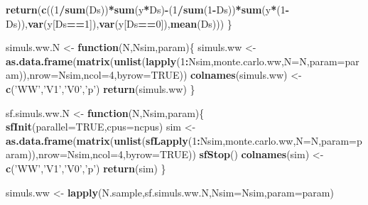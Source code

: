 \documentclass[]{book}
\newenvironment{Shaded}{\begin{snugshade}}{\end{snugshade}}
\newcommand{\KeywordTok}[1]{\textcolor[rgb]{0.13,0.29,0.53}{\textbf{#1}}}
\newcommand{\DataTypeTok}[1]{\textcolor[rgb]{0.13,0.29,0.53}{#1}}
\newcommand{\DecValTok}[1]{\textcolor[rgb]{0.00,0.00,0.81}{#1}}
\newcommand{\StringTok}[1]{\textcolor[rgb]{0.31,0.60,0.02}{#1}}
\newcommand{\OtherTok}[1]{\textcolor[rgb]{0.56,0.35,0.01}{#1}}
\newcommand{\ControlFlowTok}[1]{\textcolor[rgb]{0.13,0.29,0.53}{\textbf{#1}}}
\newcommand{\OperatorTok}[1]{\textcolor[rgb]{0.81,0.36,0.00}{\textbf{#1}}}
\newcommand{\NormalTok}[1]{#1}
\theoremstyle{definition}
\theoremstyle{definition}
\theoremstyle{definition}
\theoremstyle{remark}
\begin{document}
\begin{Shaded}
\begin{Highlighting}[]
  \KeywordTok{return}\NormalTok{(}\KeywordTok{c}\NormalTok{((}\DecValTok{1}\OperatorTok{/}\KeywordTok{sum}\NormalTok{(Ds))}\OperatorTok{*}\KeywordTok{sum}\NormalTok{(y}\OperatorTok{*}\NormalTok{Ds)}\OperatorTok{-}\NormalTok{(}\DecValTok{1}\OperatorTok{/}\KeywordTok{sum}\NormalTok{(}\DecValTok{1}\OperatorTok{-}\NormalTok{Ds))}\OperatorTok{*}\KeywordTok{sum}\NormalTok{(y}\OperatorTok{*}\NormalTok{(}\DecValTok{1}\OperatorTok{-}\NormalTok{Ds)),}\KeywordTok{var}\NormalTok{(y[Ds}\OperatorTok{==}\DecValTok{1}\NormalTok{]),}\KeywordTok{var}\NormalTok{(y[Ds}\OperatorTok{==}\DecValTok{0}\NormalTok{]),}\KeywordTok{mean}\NormalTok{(Ds)))}
\NormalTok{\}}

\NormalTok{simuls.ww.N <-}\StringTok{ }\ControlFlowTok{function}\NormalTok{(N,Nsim,param)\{}
\NormalTok{  simuls.ww <-}\StringTok{ }\KeywordTok{as.data.frame}\NormalTok{(}\KeywordTok{matrix}\NormalTok{(}\KeywordTok{unlist}\NormalTok{(}\KeywordTok{lapply}\NormalTok{(}\DecValTok{1}\OperatorTok{:}\NormalTok{Nsim,monte.carlo.ww,}\DataTypeTok{N=}\NormalTok{N,}\DataTypeTok{param=}\NormalTok{param)),}\DataTypeTok{nrow=}\NormalTok{Nsim,}\DataTypeTok{ncol=}\DecValTok{4}\NormalTok{,}\DataTypeTok{byrow=}\OtherTok{TRUE}\NormalTok{))}
  \KeywordTok{colnames}\NormalTok{(simuls.ww) <-}\StringTok{ }\KeywordTok{c}\NormalTok{(}\StringTok{'WW'}\NormalTok{,}\StringTok{'V1'}\NormalTok{,}\StringTok{'V0'}\NormalTok{,}\StringTok{'p'}\NormalTok{)}
  \KeywordTok{return}\NormalTok{(simuls.ww)}
\NormalTok{\}}

\NormalTok{sf.simuls.ww.N <-}\StringTok{ }\ControlFlowTok{function}\NormalTok{(N,Nsim,param)\{}
  \KeywordTok{sfInit}\NormalTok{(}\DataTypeTok{parallel=}\OtherTok{TRUE}\NormalTok{,}\DataTypeTok{cpus=}\NormalTok{ncpus)}
\NormalTok{  sim <-}\StringTok{ }\KeywordTok{as.data.frame}\NormalTok{(}\KeywordTok{matrix}\NormalTok{(}\KeywordTok{unlist}\NormalTok{(}\KeywordTok{sfLapply}\NormalTok{(}\DecValTok{1}\OperatorTok{:}\NormalTok{Nsim,monte.carlo.ww,}\DataTypeTok{N=}\NormalTok{N,}\DataTypeTok{param=}\NormalTok{param)),}\DataTypeTok{nrow=}\NormalTok{Nsim,}\DataTypeTok{ncol=}\DecValTok{4}\NormalTok{,}\DataTypeTok{byrow=}\OtherTok{TRUE}\NormalTok{))}
  \KeywordTok{sfStop}\NormalTok{()}
  \KeywordTok{colnames}\NormalTok{(sim) <-}\StringTok{ }\KeywordTok{c}\NormalTok{(}\StringTok{'WW'}\NormalTok{,}\StringTok{'V1'}\NormalTok{,}\StringTok{'V0'}\NormalTok{,}\StringTok{'p'}\NormalTok{)}
  \KeywordTok{return}\NormalTok{(sim)}
\NormalTok{\}}

\NormalTok{simuls.ww <-}\StringTok{ }\KeywordTok{lapply}\NormalTok{(N.sample,sf.simuls.ww.N,}\DataTypeTok{Nsim=}\NormalTok{Nsim,}\DataTypeTok{param=}\NormalTok{param)}


\end{Highlighting}
\end{Shaded}
\end{document}
